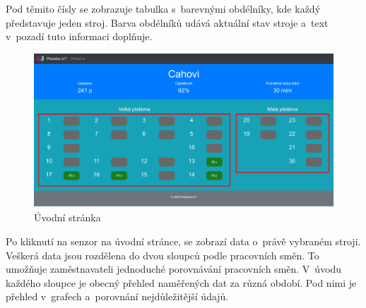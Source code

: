 Pod těmito čísly se zobrazuje tabulka s~barevnými obdélníky, kde každý představuje jeden stroj.
Barva obdélníků udává aktuální stav stroje a~text v~pozadí tuto informaci doplňuje. 

\begin{figure}[htbp]
    \centering
    \includegraphics[width=\textwidth]{img/Home.png}
    \caption{Úvodní stránka}
    \label{fig:webUvod}
\end{figure}

Po kliknutí na senzor na úvodní stránce, se zobrazí data o~právě vybraném stroji.
Veškerá data jsou rozdělena do dvou sloupců podle pracovních směn.
To umožňuje zaměstnavateli jednoduché porovnávání pracovních směn.
V~úvodu každého sloupce je obecný přehled naměřených dat za různá období.
Pod nimi je přehled v~grafech a~porovnání nejdůležitější údajů.

